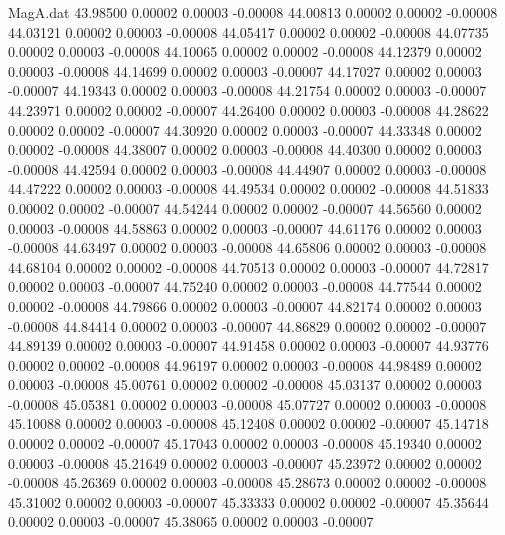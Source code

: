 \begin{filecontents}{MagA.dat}
  43.98500    0.00002    0.00003   -0.00008
  44.00813    0.00002    0.00002   -0.00008
  44.03121    0.00002    0.00003   -0.00008
  44.05417    0.00002    0.00002   -0.00008
  44.07735    0.00002    0.00003   -0.00008
  44.10065    0.00002    0.00002   -0.00008
  44.12379    0.00002    0.00003   -0.00008
  44.14699    0.00002    0.00003   -0.00007
  44.17027    0.00002    0.00003   -0.00007
  44.19343    0.00002    0.00003   -0.00008
  44.21754    0.00002    0.00003   -0.00007
  44.23971    0.00002    0.00002   -0.00007
  44.26400    0.00002    0.00003   -0.00008
  44.28622    0.00002    0.00002   -0.00007
  44.30920    0.00002    0.00003   -0.00007
  44.33348    0.00002    0.00002   -0.00008
  44.38007    0.00002    0.00003   -0.00008
  44.40300    0.00002    0.00003   -0.00008
  44.42594    0.00002    0.00003   -0.00008
  44.44907    0.00002    0.00003   -0.00008
  44.47222    0.00002    0.00003   -0.00008
  44.49534    0.00002    0.00002   -0.00008
  44.51833    0.00002    0.00002   -0.00007
  44.54244    0.00002    0.00002   -0.00007
  44.56560    0.00002    0.00003   -0.00008
  44.58863    0.00002    0.00003   -0.00007
  44.61176    0.00002    0.00003   -0.00008
  44.63497    0.00002    0.00003   -0.00008
  44.65806    0.00002    0.00003   -0.00008
  44.68104    0.00002    0.00002   -0.00008
  44.70513    0.00002    0.00003   -0.00007
  44.72817    0.00002    0.00003   -0.00007
  44.75240    0.00002    0.00003   -0.00008
  44.77544    0.00002    0.00002   -0.00008
  44.79866    0.00002    0.00003   -0.00007
  44.82174    0.00002    0.00003   -0.00008
  44.84414    0.00002    0.00003   -0.00007
  44.86829    0.00002    0.00002   -0.00007
  44.89139    0.00002    0.00003   -0.00007
  44.91458    0.00002    0.00003   -0.00007
  44.93776    0.00002    0.00002   -0.00008
  44.96197    0.00002    0.00003   -0.00008
  44.98489    0.00002    0.00003   -0.00008
  45.00761    0.00002    0.00002   -0.00008
  45.03137    0.00002    0.00003   -0.00008
  45.05381    0.00002    0.00003   -0.00008
  45.07727    0.00002    0.00003   -0.00008
  45.10088    0.00002    0.00003   -0.00008
  45.12408    0.00002    0.00002   -0.00007
  45.14718    0.00002    0.00002   -0.00007
  45.17043    0.00002    0.00003   -0.00008
  45.19340    0.00002    0.00003   -0.00008
  45.21649    0.00002    0.00003   -0.00007
  45.23972    0.00002    0.00002   -0.00008
  45.26369    0.00002    0.00003   -0.00008
  45.28673    0.00002    0.00002   -0.00008
  45.31002    0.00002    0.00003   -0.00007
  45.33333    0.00002    0.00002   -0.00007
  45.35644    0.00002    0.00003   -0.00007
  45.38065    0.00002    0.00003   -0.00007

\end{filecontents}
